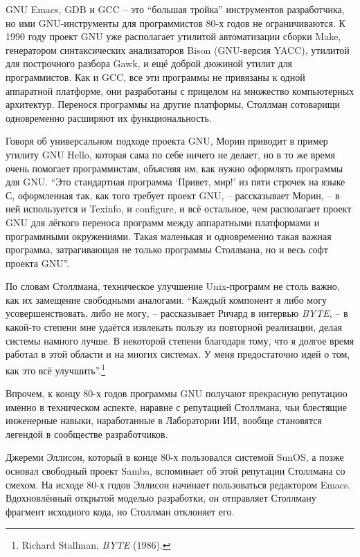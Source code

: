 GNU Emacs, GDB и GCC -- это \enquote{большая тройка} инструментов разработчика, но ими GNU-инструменты для программистов 80-х годов не ограничиваются. К 1990 году проект GNU уже располагает утилитой автоматизации сборки Make, генератором синтаксических анализаторов Bison (GNU-версия YACC), утилитой для построчного разбора Gawk, и ещё доброй дюжиной утилит для программистов. Как и GCC, все эти программы не привязаны к одной аппаратной платформе, они разработаны с прицелом на множество компьютерных архитектур. Перенося программы на другие платформы, Столлман сотоварищи одновременно расширяют их функциональность.

Говоря об универсальном подходе проекта GNU, Морин приводит в пример утилиту GNU Hello, которая сама по себе ничего не делает, но в то же время очень помогает программистам, объясняя им, как нужно оформлять программы для GNU. \enquote{Это стандартная программа \enquote{Привет, мир!} из пяти строчек на языке С, оформленная так, как того требует проект GNU, -- рассказывает Морин, -- в ней используется и Texinfo, и configure, и всё остальное, чем располагает проект GNU для лёгкого переноса программ между аппаратными платформами и программными окружениями. Такая маленькая и одновременно такая важная программа, затрагивающая не только программы Столлмана, но и весь софт проекта GNU}.

По словам Столлмана, техническое улучшение Unix-программ не столь важно, как их замещение свободными аналогами. \enquote{Каждый компонент я либо могу усовершенствовать, либо не могу, -- рассказывает Ричард в интервью \textit{BYTE}, -- в какой-то степени мне удаётся извлекать пользу из повторной реализации, делая системы намного лучше. В некоторой степени благодаря тому, что я долгое время работал в этой области и на многих системах. У меня предостаточно идей о том, как это всё улучшить}.\footnote{Richard Stallman, \textit{BYTE} (1986).}

Впрочем, к концу 80-х годов программы GNU получают прекрасную репутацию именно в техническом аспекте, наравне с репутацией Столлмана, чьи блестящие инженерные навыки, наработанные в Лаборатории ИИ, вообще становятся легендой в сообществе разработчиков.

Джереми Эллисон, который в конце 80-х пользовался системой SunOS, а позже основал свободный проект Samba, вспоминает об этой репутации Столлмана со смехом. На исходе 80-х годов Эллисон начинает пользоваться редактором Emacs. Вдохновлённый открытой моделью разработки, он отправляет Столлману фрагмент исходного кода, но Столлман отклоняет его.


